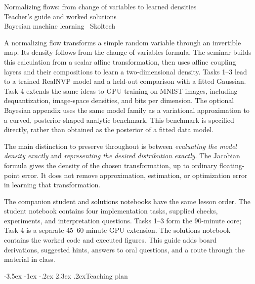 \documentclass[11pt,a4paper]{article}
\makeatletter
\renewcommand\section{\@startsection{section}{1}{\z@}%
  {-3.5ex \@plus -1ex \@minus -.2ex}%
  {2.3ex \@plus .2ex}{\normalfont\Large}}
\makeatother
\begin{document}
\begin{center}
  {\LARGE Normalizing flows: from change of variables to learned densities}\\[6pt]
  {\large Teacher's guide and worked solutions}\\[3pt]
  Bayesian machine learning \textbar\ Skoltech
\end{center}

A normalizing flow transforms a simple random variable through an invertible
map. Its density follows from the change-of-variables formula. The seminar
builds this calculation from a scalar affine transformation, then uses affine
coupling layers and their compositions to learn a two-dimensional density.
Tasks 1--3 lead to a trained RealNVP model and a held-out comparison with a
fitted Gaussian. Task 4 extends the same ideas to GPU training on MNIST images,
including dequantization, image-space densities, and bits per dimension.
The optional Bayesian appendix uses the
same model family as a variational approximation to a curved, posterior-shaped
analytic benchmark. This benchmark is specified directly, rather than obtained
as the posterior of a fitted data model.

The main distinction to preserve throughout is between \emph{evaluating the
model density exactly} and \emph{representing the desired distribution exactly}.
The Jacobian formula gives the density of the chosen transformation, up to
ordinary floating-point error. It does not remove approximation, estimation,
or optimization error in learning that transformation.

The companion student and solutions notebooks have the same lesson order.
The student notebook contains four implementation tasks, supplied checks,
experiments, and interpretation questions. Tasks 1--3 form the 90-minute core;
Task 4 is a separate 45--60-minute GPU extension. The solutions notebook
contains the
worked code and executed figures. This guide adds board derivations, suggested
hints, answers to oral questions, and a route through the material in class.

\section{Teaching plan}
\end{document}
